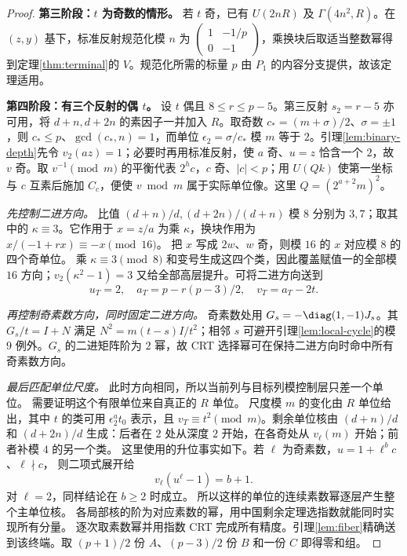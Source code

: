 \begin{proof}
\par\noindent\textbf{第三阶段：$t$ 为奇数的情形。}
若 $t$ 奇，已有 $U(2nR)$ 及 $\Gamma(4n^2,R)$。在 $(z,y)$ 基下，标准反射规范化模 $n$ 为 $\left(\begin{smallmatrix}1&-1/p\\0&-1\end{smallmatrix}\right)$，乘换块后取适当整数幂得到定理\ref{thm:terminal}的 $V$。规范化所需的标量 $p$ 由 $P_1$ 的内容分支提供，故该定理适用。


\par\noindent\textbf{第四阶段：有三个反射的偶 $t$。}
设 $t$ 偶且 $8\le r\le p-5$。第三反射 $s_2=r-5$ 亦可用，将 $d+n,d+2n$ 的素因子一并加入 $R$。取奇数 $c_*=(m+\sigma)/2$、$\sigma=\pm1$，则 $c_*\le p$、$\gcd(c_*,n)=1$，而单位 $\epsilon_2=\sigma/c_*$ 模 $m$ 等于 $2$。引理\ref{lem:binary-depth}先令 $v_2(az)=1$；必要时再用标准反射，使 $a$ 奇、$u=z$ 恰含一个 $2$，故 $v$ 奇。取 $v^{-1}\pmod m$ 的平衡代表 $2^h c$，$c$ 奇、$|c|<p$；用 $U(Qk)$ 使第一坐标与 $c$ 互素后施加 $C_c$，便使 $v\bmod m$ 属于实际单位像。这里 $Q=(2^{a+2}m)^2$。

\par\noindent\emph{先控制二进方向。}
比值 $(d+n)/d,(d+2n)/(d+n)$ 模 $8$ 分别为 $3,7$；取其中的 $\kappa\equiv3$。它作用于 $x=z/a$ 为乘 $\kappa$，换块作用为 $x/(-1+rx)\equiv-x\pmod{16}$。
把 $x$ 写成 $2w$、$w$ 奇，则模 $16$ 的 $x$ 对应模 $8$ 的四个奇单位。
乘 $\kappa\equiv3\pmod8$ 和变号生成这四个类，因此覆盖赋值一的全部模 $16$ 方向；$v_2(\kappa^2-1)=3$ 又给全部高层提升。可将二进方向送到
\[
u_T=2,\quad a_T=p-r(p-3)/2,\quad v_T=a_T-2t.
\]

\par\noindent\emph{再控制奇素数方向，同时固定二进方向。}
奇素数处用 $G_s=-\diag(1,-1)J_s$。其 $G_s/t=I+N$ 满足 $N^2=m(t-s)I/t^2$；相邻 $s$ 可避开引理\ref{lem:local-cycle}的模 $9$ 例外。$G_s$ 的二进矩阵阶为 $2$ 幂，故 CRT 选择幂可在保持二进方向时命中所有奇素数方向。

\par\noindent\emph{最后匹配单位尺度。}
此时方向相同，所以当前列与目标列模控制层只差一个单位。
需要证明这个有限单位来自真正的 $R$ 单位。
尺度模 $m$ 的变化由 $R$ 单位给出，其中 $t$ 的类可用 $\epsilon_2^a t_0$ 表示，且 $v_T\equiv t^2\pmod m$。剩余单位核由 $(d+n)/d$ 和 $(d+2n)/d$ 生成：后者在 $2$ 处从深度 $2$ 开始，在各奇处从 $v_\ell(m)$ 开始；前者补模 $4$ 的另一个类。
这里使用的升位事实如下。若 $\ell$ 为奇素数，$u=1+\ell^b c$、$\ell\nmid c$，
则二项式展开给
\[
v_\ell(u^\ell-1)=b+1.
\]
对 $\ell=2$，同样结论在 $b\ge2$ 时成立。
所以这样的单位的连续素数幂逐层产生整个主单位核。
各局部核的阶为对应素数的幂，用中国剩余定理选指数就能同时实现所有分量。
逐次取素数幂并用指数 CRT 完成所有精度。引理\ref{lem:fiber}精确送到该终端。取 $(p+1)/2$ 份 $A$、$(p-3)/2$ 份 $B$ 和一份 $C$ 即得零和组。



\end{proof}

